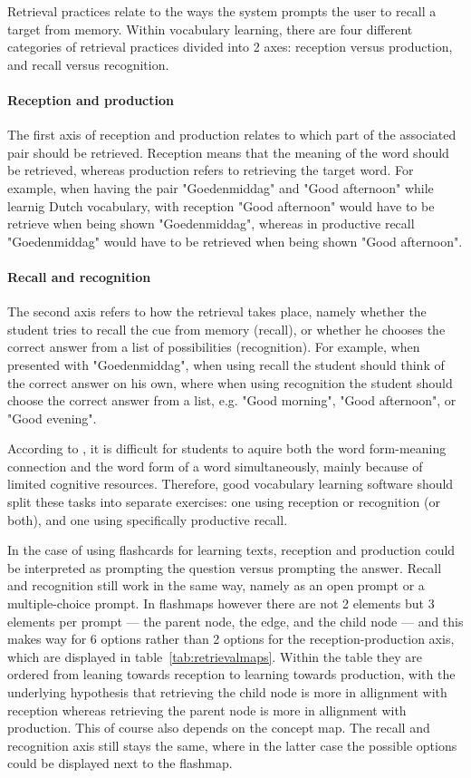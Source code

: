 Retrieval practices relate to the ways the system prompts the user to recall a target from memory. Within vocabulary learning, there are four different categories of retrieval practices divided into 2 axes: reception versus production, and recall versus recognition. 

\paragraph{Reception and production} The first axis of reception and production relates to which part of the associated pair should be retrieved. Reception means that the meaning of the word should be retrieved, whereas production refers to retrieving the target word. For example, when having the pair "Goedenmiddag" and "Good afternoon" while learnig Dutch vocabulary, with reception "Good afternoon" would have to be retrieve when being shown "Goedenmiddag", whereas in productive recall "Goedenmiddag" would have to be retrieved when being shown "Good afternoon".

\paragraph{Recall and recognition} The second axis refers to how the retrieval takes place, namely whether the student tries to recall the cue from memory (recall), or whether he chooses the correct answer from a list of possibilities (recognition). For example, when presented with "Goedenmiddag", when using recall the student should think of the correct answer on his own, where when using recognition the student should choose the correct answer from a list, e.g. "Good morning", "Good afternoon", or "Good evening".

According to , it is difficult for students to aquire both the word form-meaning connection and the word form of a word simultaneously, mainly because of limited cognitive resources. Therefore, good vocabulary learning software should split these tasks into separate exercises: one using reception or recognition (or both), and one using specifically productive recall.

In the case of using flashcards for learning texts, reception and production could be interpreted as prompting the question versus prompting the answer. Recall and recognition still work in the same way, namely as an open prompt or a multiple-choice prompt. In flashmaps however there are not 2 elements but 3 elements per prompt --- the parent node, the edge, and the child node --- and this makes way for 6 options rather than 2 options for the reception-production axis, which are displayed in table~\ref{tab:retrievalmaps}. Within the table they are ordered from leaning towards reception to learning towards production, with the underlying hypothesis that retrieving the child node is more in allignment with reception whereas retrieving the parent node is more in allignment with production. This of course also depends on the concept map. The recall and recognition axis still stays the same, where in the latter case the possible options could be displayed next to the flashmap.

